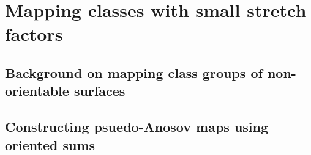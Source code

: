 \section{Mapping classes with small stretch factors}
\label{sec:mapping-classes-with}

\subsection{Background on mapping class groups of non-orientable surfaces}
\label{sec:backgr-mapp-class}

\subsection{Constructing psuedo-Anosov maps using oriented sums}
\label{sec:constr-psuedo-anos}
